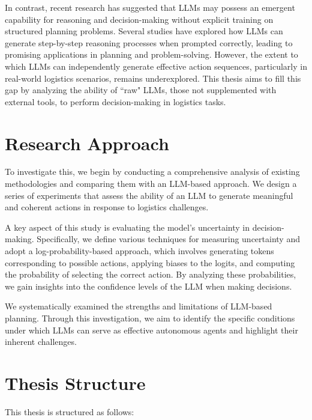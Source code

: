 In contrast, recent research has suggested that LLMs may possess an emergent capability
for reasoning and decision-making without explicit training on structured planning
problems. Several studies have explored how LLMs can generate step-by-step
reasoning processes when prompted correctly, leading to promising applications in
planning and problem-solving. However, the extent to which LLMs can independently
generate effective action sequences, particularly in real-world logistics
scenarios, remains underexplored. This thesis aims to fill this gap by analyzing
the ability of ``raw" LLMs, those not supplemented with external tools, to perform
decision-making in logistics tasks.

\section{Research Approach}

To investigate this, we begin by conducting a comprehensive analysis of existing
methodologies and comparing them with an LLM-based approach. We design a series
of experiments that assess the ability of an LLM to generate meaningful and
coherent actions in response to logistics challenges.

A key aspect of this study is evaluating the model's uncertainty in decision-making.
Specifically, we define various techniques for measuring uncertainty and adopt a
log-probability-based approach, which involves generating tokens corresponding to
possible actions, applying biases to the logits, and computing the probability of
selecting the correct action. By analyzing these probabilities, we gain insights
into the confidence levels of the LLM when making decisions.

We systematically examined the strengths and limitations of LLM-based planning.
Through this investigation, we aim to identify the specific conditions under which
LLMs can serve as effective autonomous agents and highlight their inherent challenges.

\section{Thesis Structure}

This thesis is structured as follows:

